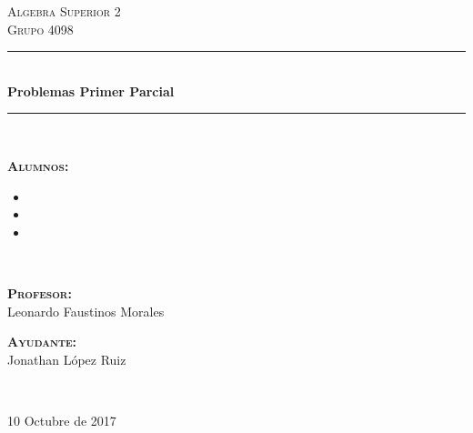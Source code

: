 \documentclass[12pt, fleqn]{article}                             %
\author{Oscar Andrés Rosas}                                     %
\begin{document}
\begin{titlepage}

    \center
    \textsc{\Large Algebra Superior 2}\\[0.5cm] 
    \textsc{\large Grupo 4098}\\[1.0cm]

    \rule{\linewidth}{0.5mm} \\[1.0cm]
        { \huge \bfseries Problemas Primer Parcial}\\[1.0cm] 
    \rule{\linewidth}{0.5mm} \\[1.5cm]
     
    \begin{minipage}{0.55\textwidth}
        \begin{flushleft}
            \footnotesize{
            \textbf{\textsc{Alumnos:}}\\
                \begin{itemize}
                    \item
                    \item
                    \item
                \end{itemize}
            }
        \end{flushleft}
    \end{minipage}
    ~
    \begin{minipage}{0.4\textwidth}
        \begin{flushright} \footnotesize
            \textbf{\textsc{Profesor: }}\\
            Leonardo Faustinos Morales

            \vspace{2em}

            \textbf{\textsc{Ayudante: }}\\
            Jonathan López Ruiz
        \end{flushright}
    \end{minipage}\\[3,5cm]


    \vspace{5em}

    
    {\large 10 Octubre de 2017}\\[1cm] 

    \vfill

\end{titlepage}
\end{document}

